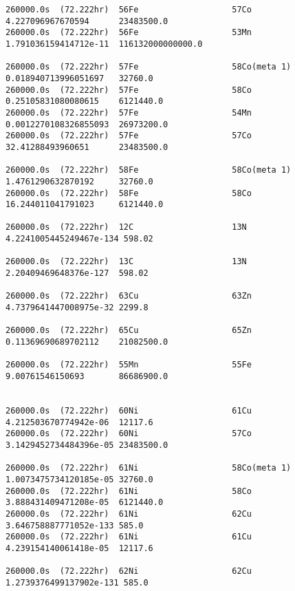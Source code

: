 \begin{lstlisting}[style=sOutputFile,caption={Final results for steel irradiation},label={listing:alexsteel}]
260000.0s  (72.222hr)  56Fe                   57Co                   4.227096967670594      23483500.0            
260000.0s  (72.222hr)  56Fe                   53Mn                   1.791036159414712e-11  116132000000000.0     

260000.0s  (72.222hr)  57Fe                   58Co(meta 1)           0.018940713996051697   32760.0               
260000.0s  (72.222hr)  57Fe                   58Co                   0.25105831080080615    6121440.0             
260000.0s  (72.222hr)  57Fe                   54Mn                   0.0012270108326855093  26973200.0            
260000.0s  (72.222hr)  57Fe                   57Co                   32.41288493960651      23483500.0            

260000.0s  (72.222hr)  58Fe                   58Co(meta 1)           1.4761290632870192     32760.0               
260000.0s  (72.222hr)  58Fe                   58Co                   16.244011041791023     6121440.0             

260000.0s  (72.222hr)  12C                    13N                    4.2241005445249467e-134 598.02                

260000.0s  (72.222hr)  13C                    13N                    2.20409469648376e-127  598.02                

260000.0s  (72.222hr)  63Cu                   63Zn                   4.7379641447008975e-32 2299.8                

260000.0s  (72.222hr)  65Cu                   65Zn                   0.11369690689702112    21082500.0            

260000.0s  (72.222hr)  55Mn                   55Fe                   9.00761546150693       86686900.0            


260000.0s  (72.222hr)  60Ni                   61Cu                   4.212503670774942e-06  12117.6               
260000.0s  (72.222hr)  60Ni                   57Co                   3.1429452734484396e-05 23483500.0            

260000.0s  (72.222hr)  61Ni                   58Co(meta 1)           1.0073475734120185e-05 32760.0               
260000.0s  (72.222hr)  61Ni                   58Co                   3.888431409471208e-05  6121440.0             
260000.0s  (72.222hr)  61Ni                   62Cu                   3.646758887771052e-133 585.0                 
260000.0s  (72.222hr)  61Ni                   61Cu                   4.239154140061418e-05  12117.6               

260000.0s  (72.222hr)  62Ni                   62Cu                   1.2739376499137902e-131 585.0                 


\end{lstlisting}
